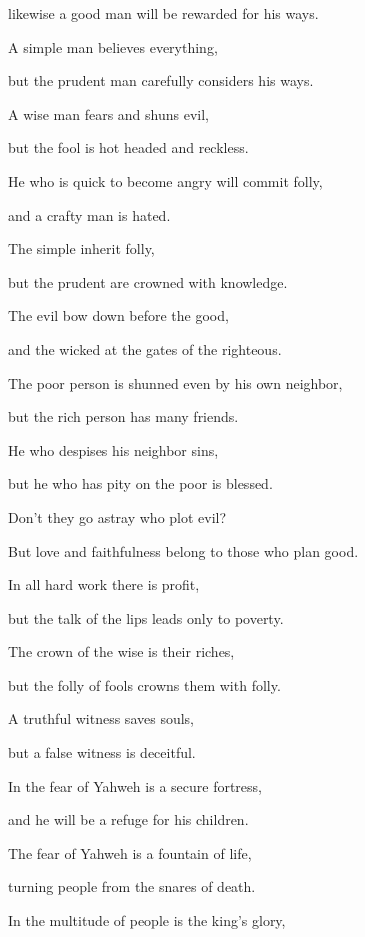 {\par }{\QB likewise a good man will be rewarded for his ways.
\par }{\Q {}A simple man believes everything,
\par }{\QB but the prudent man carefully considers his ways.
\par }{\Q {}A wise man fears and shuns evil,
\par }{\QB but the fool is hot headed and reckless.
\par }{\Q {}He who is quick to become angry will commit folly,
\par }{\QB and a crafty man is hated.
\par }{\Q {}The simple inherit folly,
\par }{\QB but the prudent are crowned with knowledge.
\par }{\Q {}The evil bow down before the good,
\par }{\QB and the wicked at the gates of the righteous.
\par }{\Q {}The poor person is shunned even by his own neighbor,
\par }{\QB but the rich person has many friends.
\par }{\Q {}He who despises his neighbor sins,
\par }{\QB but he who has pity on the poor is blessed.
\par }{\Q {}Don’t they go astray who plot evil?
\par }{\QB But love and faithfulness belong to those who plan good.
\par }{\Q {}In all hard work there is profit,
\par }{\QB but the talk of the lips leads only to poverty.
\par }{\Q {}The crown of the wise is their riches,
\par }{\QB but the folly of fools crowns them with folly.
\par }{\Q {}A truthful witness saves souls,
\par }{\QB but a false witness is deceitful.
\par }{\Q {}In the fear of Yahweh is a secure fortress,
\par }{\QB and he will be a refuge for his children.
\par }{\Q {}The fear of Yahweh is a fountain of life,
\par }{\QB turning people from the snares of death.
\par }{\Q {}In the multitude of people is the king’s glory,
}
